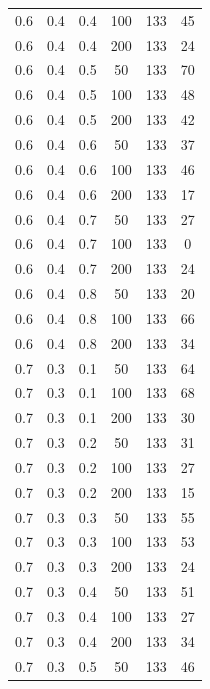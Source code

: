 \documentclass[a4paper,14pt, unknownkeysallowed]{extreport}
\begin{document}
\begin{center}
\begin{longtable}[c]{|c|c|c|c|c|c|}
         0.6 &  0.4 &  0.4 &  100 &   133 &    45 \\
         0.6 &  0.4 &  0.4 &  200 &   133 &    24 \\
        \hline
         0.6 &  0.4 &  0.5 &   50 &   133 &    70 \\
         0.6 &  0.4 &  0.5 &  100 &   133 &    48 \\
         0.6 &  0.4 &  0.5 &  200 &   133 &    42 \\
        \hline
         0.6 &  0.4 &  0.6 &   50 &   133 &    37 \\
         0.6 &  0.4 &  0.6 &  100 &   133 &    46 \\
         0.6 &  0.4 &  0.6 &  200 &   133 &    17 \\
        \hline
         0.6 &  0.4 &  0.7 &   50 &   133 &    27 \\
         0.6 &  0.4 &  0.7 &  100 &   133 &     0 \\
         0.6 &  0.4 &  0.7 &  200 &   133 &    24 \\
        \hline
         0.6 &  0.4 &  0.8 &   50 &   133 &    20 \\
         0.6 &  0.4 &  0.8 &  100 &   133 &    66 \\
         0.6 &  0.4 &  0.8 &  200 &   133 &    34 \\
        \hline
         0.7 &  0.3 &  0.1 &   50 &   133 &    64 \\
         0.7 &  0.3 &  0.1 &  100 &   133 &    68 \\
         0.7 &  0.3 &  0.1 &  200 &   133 &    30 \\
        \hline
         0.7 &  0.3 &  0.2 &   50 &   133 &    31 \\
         0.7 &  0.3 &  0.2 &  100 &   133 &    27 \\
         0.7 &  0.3 &  0.2 &  200 &   133 &    15 \\
        \hline
         0.7 &  0.3 &  0.3 &   50 &   133 &    55 \\
         0.7 &  0.3 &  0.3 &  100 &   133 &    53 \\
         0.7 &  0.3 &  0.3 &  200 &   133 &    24 \\
        \hline
         0.7 &  0.3 &  0.4 &   50 &   133 &    51 \\
         0.7 &  0.3 &  0.4 &  100 &   133 &    27 \\
         0.7 &  0.3 &  0.4 &  200 &   133 &    34 \\
        \hline
         0.7 &  0.3 &  0.5 &   50 &   133 &    46 \\

\end{longtable}
\end{center}
\end{document}
